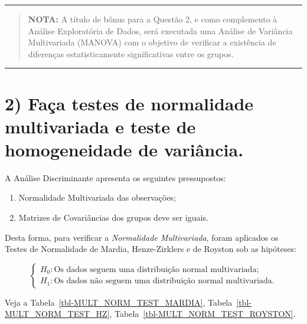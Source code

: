 \documentclass[
  portuguese,
  11pt,
]{article}
\providecommand{\tightlist}{%
  \setlength{\itemsep}{0pt}\setlength{\parskip}{0pt}}
\begin{document}
\begin{center}\rule{0.5\linewidth}{0.5pt}\end{center}

\begin{quote}
\textbf{NOTA:} A título de bônus para a Questão 2, e como complemento à
Análise Exploratória de Dados, será executada uma Análise de Variância
Multivariada (MANOVA) com o objetivo de verificar a existência de
diferenças estatisticamente significativas entre os grupos.
\end{quote}

\begin{center}\rule{0.5\linewidth}{0.5pt}\end{center}

\section*{2) Faça testes de normalidade multivariada e teste de
homogeneidade de
variância.}\label{fauxe7a-testes-de-normalidade-multivariada-e-teste-de-homogeneidade-de-variuxe2ncia.}

A Análise Discriminante apresenta os seguintes pressupostos:

\begin{enumerate}
\def\labelenumi{\arabic{enumi}.}
\tightlist
\item
  Normalidade Multivariada das observações;
\item
  Matrizes de Covariâncias dos grupos deve ser iguais.
\end{enumerate}

Desta forma, para verificar a \emph{Normalidade Multivariada}, foram
aplicados os Testes de Normalidade de Mardia, Henze-Zirklers e de
Royston sob as hipóteses:

\[
\begin{cases} H_{0}: \text{Os dados seguem uma distribuição normal multivariada;} \\ H_{1}: \text{Os dados não seguem uma distribuição normal multivariada.} \end{cases}
\]

\noindent Veja a Tabela~\ref{tbl-MULT_NORM_TEST_MARDIA},
Tabela~\ref{tbl-MULT_NORM_TEST_HZ},
Tabela~\ref{tbl-MULT_NORM_TEST_ROYSTON}.
\end{document}
